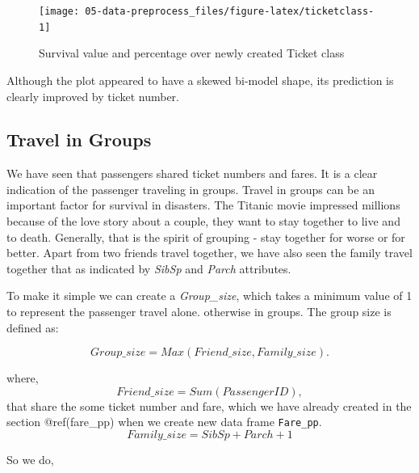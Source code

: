 \documentclass[
]{book}
\newenvironment{Shaded}{\begin{snugshade}}{\end{snugshade}}
\newcommand{\DecValTok}[1]{\textcolor[rgb]{0.00,0.00,0.81}{#1}}
\newcommand{\KeywordTok}[1]{\textcolor[rgb]{0.13,0.29,0.53}{\textbf{#1}}}
\newcommand{\NormalTok}[1]{#1}
\newcommand{\OperatorTok}[1]{\textcolor[rgb]{0.81,0.36,0.00}{\textbf{#1}}}
\newcommand{\StringTok}[1]{\textcolor[rgb]{0.31,0.60,0.02}{#1}}
\begin{document}
\begin{figure}

{\centering \texttt{[image: 05-data-preprocess\_files/figure-latex/ticketclass-1]} 

}

\caption{Survival value and percentage over newly created Ticket class}\label{fig:ticketclass}
\end{figure}

Although the plot appeared to have a skewed bi-model shape, its prediction is clearly improved by ticket number.

\hypertarget{travel-in-groups}{%
\subsection*{Travel in Groups}\label{travel-in-groups}}


We have seen that passengers shared ticket numbers and fares. It is a clear indication of the passenger traveling in groups. Travel in groups can be an important factor for survival in disasters. The Titanic movie impressed millions because of the love story about a couple, they want to stay together to live and to death. Generally, that is the spirit of grouping - stay together for worse or for better. Apart from two friends travel together, we have also seen the family travel together that as indicated by \emph{SibSp} and \emph{Parch} attributes.

To make it simple we can create a \emph{Group\_size}, which takes a minimum value of 1 to represent the passenger travel alone. otherwise in groups. The group size is defined as:

\begin{equation} 
Group\_size = Max(Friend\_size, Family\_size).
\label{eq:group}
\end{equation}

where,
\begin{equation} 
Friend\_size = Sum(PassengerID),
\label{eq:friend}
\end{equation}
that share the some ticket number and fare, which we have already created in the section @ref(fare\_pp) when we create new data frame \texttt{Fare\_pp}.
\begin{equation} 
Family\_size = SibSp + Parch + 1
\label{eq:family}
\end{equation}

So we do,

\begin{Shaded}
\end{Shaded}
\end{document}
